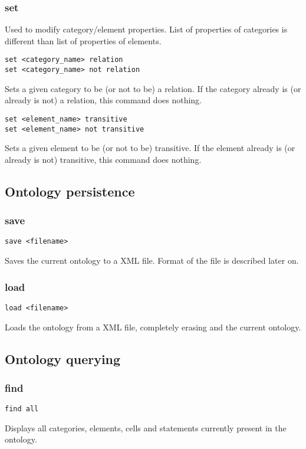 \documentclass{article}
\begin{document}
\subsubsection{set}
Used to modify category/element properties. List of properties of categories 
is different than list of properties of elements. 

\begin{verbatim}
set <category_name> relation
set <category_name> not relation
\end{verbatim}
Sets a given category to be (or not to be) a relation. If the category already is 
(or already is not) a relation, this command does nothing.

\begin{verbatim}
set <element_name> transitive
set <element_name> not transitive
\end{verbatim}
Sets a given element to be (or not to be) transitive. If the element already is 
(or already is not) transitive, this command does nothing.

\subsection{Ontology persistence}

\subsubsection{save}
\begin{verbatim}
save <filename>
\end{verbatim}
Saves the current ontology to a XML file. Format of the file is described later on.

\subsubsection{load}
\begin{verbatim}
load <filename>
\end{verbatim}
Loads the ontology from a XML file, completely erasing and the current ontology.

\subsection{Ontology querying}
\subsubsection{find}
\begin{verbatim}
find all
\end{verbatim}
Displays all categories, elements, cells and statements currently present in the ontology.
\end{document}
